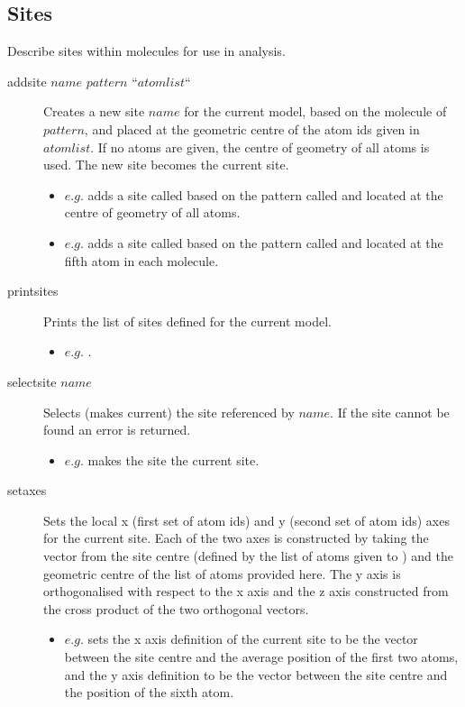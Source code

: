 \subsection{Sites}
Describe sites within molecules for use in analysis.\\
\begin{description}

	\item[addsite $name$ $pattern$ ``$atomlist$``\its] Creates a new site $name$ for the current model, based on the molecule of $pattern$, and placed at the geometric centre of the atom ids given in $atomlist$. If no atoms are given, the centre of geometry of all atoms is used. The new site becomes the current site.
	\begin{itemize}
		\item $e.g.$  adds a site called  based on the pattern called  and located at the centre of geometry of all atoms.
		\item $e.g.$  adds a site called  based on the pattern called  and located at the fifth atom in each molecule.
	\end{itemize}

	\item[printsites\its] Prints the list of sites defined for the current model.
	\begin{itemize}
		\item $e.g.$ .
	\end{itemize}

	\item[selectsite $name$\its] Selects (makes current) the site referenced by $name$. If the site cannot be found an error is returned.
	\begin{itemize}
		\item $e.g.$  makes the site  the current site.
	\end{itemize}

	\item[setaxes  \its] Sets the local x (first set of atom ids) and y (second set of atom ids) axes for the current site. Each of the two axes is constructed by taking the vector from the site centre (defined by the list of atoms given to ) and the geometric centre of the list of atoms provided here. The y axis is orthogonalised with respect to the x axis and the z axis constructed from the cross product of the two orthogonal vectors.
	\begin{itemize}
		\item $e.g.$  sets the x axis definition of the current site to be the vector between the site centre and the average position of the first two atoms, and the y axis definition to be the vector between the site centre and the position of the sixth atom.
	\end{itemize}

\end{description}


